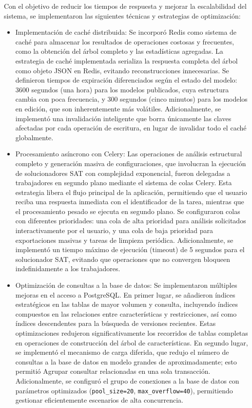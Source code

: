 Con el objetivo de reducir los tiempos de respuesta y mejorar la escalabilidad del sistema, 
se implementaron las siguientes técnicas y estrategias de optimización:

\begin{itemize}
    \item Implementación de caché distribuida: Se incorporó Redis como sistema de caché para almacenar 
    los resultados de operaciones costosas y frecuentes, como la obtención del árbol completo y las 
    estadísticas agregadas. La estrategia de caché implementada serializa la respuesta completa del árbol 
    como objeto JSON en Redis, evitando reconstrucciones innecesarias. Se definieron tiempos de expiración 
    diferenciados según el estado del modelo: 3600 segundos (una hora) para los modelos publicados, cuya 
    estructura cambia con poca frecuencia, y 300 segundos (cinco minutos) para los modelos en edición, 
    que son inherentemente más volátiles. Adicionalmente, se implementó una invalidación inteligente que 
    borra únicamente las claves afectadas por cada operación de escritura, en lugar de invalidar todo el 
    caché globalmente.
    
    \item Procesamiento asíncrono con Celery: Las operaciones de análisis estructural completo y generación 
    masiva de configuraciones, que involucran la ejecución de solucionadores SAT con complejidad exponencial, 
    fueron delegadas a trabajadores en segundo plano mediante el sistema de colas Celery. Esta estrategia 
    libera el flujo principal de la aplicación, permitiendo que el usuario reciba una respuesta inmediata 
    con el identificador de la tarea, mientras que el procesamiento pesado se ejecuta en segundo plano. 
    Se configuraron colas con diferentes prioridades: una cola de alta prioridad para análisis solicitados 
    interactivamente por el usuario, y una cola de baja prioridad para exportaciones masivas y tareas de 
    limpieza periódica. Adicionalmente, se implementó un tiempo máximo de ejecución (timeout) de 5
    segundos para el solucionador SAT, evitando que operaciones que no convergen bloqueen indefinidamente a 
    los trabajadores.
    
    \item Optimización de consultas a la base de datos: Se implementaron múltiples mejoras en el acceso a 
    PostgreSQL. En primer lugar, se añadieron índices estratégicos en las tablas de mayor volumen y 
    consulta, incluyendo índices compuestos en las relaciones entre características y restricciones, 
    así como índices descendentes para la búsqueda de versiones recientes. Estas optimizaciones 
    redujeron significativamente los recorridos de tablas completas en operaciones de construcción del 
    árbol de características. En segundo lugar, se implementó el mecanismo de carga diferida, que redujo 
    el número de consultas a la base de datos en modelo grandes de aproximadamente; esto permitió Agrupar
    consultar relacionadas en una sola transacción. Adicionalmente, se configuró el grupo de conexiones a 
    la base de datos con parámetros optimizados (\texttt{pool\_size=20}, \texttt{max\_overflow=40}), 
    permitiendo gestionar eficientemente escenarios de alta concurrencia.
    

\end{itemize}
